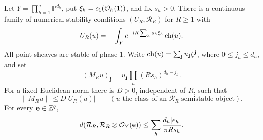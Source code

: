 \begin{proposition}\label{prop:weighted-ambient}
Let $Y=\prod_{h=1}^q\mathbb P^{d_h}$, put
$\xi_h=c_1(\mathcal O_h(1))$, and fix $s_h>0$.  There is a continuous family of
numerical stability conditions $(U_R,\mathcal R_R)$ for $R\ge1$ with
\[
 U_R(u)=-\int_Ye^{-iR\sum_hs_h\xi_h}\operatorname{ch}(u).
\]
All point sheaves are stable of phase $1$.  Write
$\operatorname{ch}(u)=\sum_{\mathbf j}u_{\mathbf j}\xi^{\mathbf j}$, where
$0\le j_h\le d_h$, and set
\begin{equation}\label{eq:ambient-scaled-coordinates}
 (M_Ru)_{\mathbf j}=
 u_{\mathbf j}\prod_h(Rs_h)^{d_h-j_h}.
\end{equation}
For a fixed Euclidean norm there is $D>0$, independent of $R$, such that
\begin{equation}\label{eq:ambient-support}
 \|M_Ru\|\le D|U_R(u)|\qquad
 (u\text{ the class of an }\mathcal R_R\text{-semistable object}).
\end{equation}
For every $\mathbf e\in\mathbb Z^q$,
\begin{equation}\label{eq:ambient-twist-distance}
 d(\mathcal R_R,\mathcal R_R\otimes\mathcal O_Y(\mathbf e))
 \le\sum_h\frac{d_h|e_h|}{\pi Rs_h}.
\end{equation}
\end{proposition}

